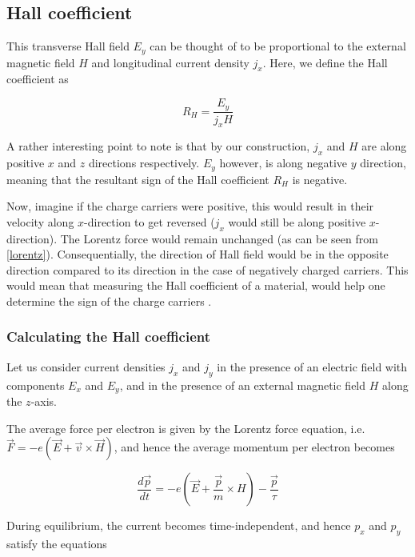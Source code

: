 \subsection{Hall coefficient}

This transverse Hall field $ E_y $ can be thought of to be proportional to the external magnetic field $ H $ and longitudinal current density $ j_x $.
Here, we define the Hall coefficient as

\begin{equation} \label{hall-coeff}
    R_H = \frac{E_y}{j_x H}
\end{equation}

A rather interesting point to note is that by our construction, $ j_x $ and $ H $ are along positive $ x $ and $ z $ directions respectively.
$ E_y $ however, is along negative $ y $ direction, meaning that the resultant sign of the Hall coefficient $ R_H $ is negative.

Now, imagine if the charge carriers were positive, this would result in their velocity along $ x $-direction to get reversed ($ j_x $ would still be along positive $ x $-direction).
The Lorentz force would remain unchanged (as can be seen from \cref{lorentz}).
Consequentially, the direction of Hall field would be in the opposite direction compared to its direction in the case of negatively charged carriers.
This would mean that measuring the Hall coefficient of a material, would help one determine the sign of the charge carriers \cite{ashcroft1976solid}.

\subsubsection{Calculating the Hall coefficient}

Let us consider current densities $ j_x $ and $ j_y $ in the presence of an electric field with components $ E_x $ and $ E_y $, and in the presence of an external magnetic field $ H $ along the $ z $-axis.

The average force per electron is given by the Lorentz force equation, i.e. $ \vec{F} = -e (\vec{E} + \vec{v} \times \vec{H}) $, and hence the average momentum per electron becomes

\begin{equation}
    \frac{d \vec{p}}{dt} = -e \left( \vec{E} + \frac{\vec{p}}{m} \times H \right) - \frac{\vec{p}}{\tau}
\end{equation}

During equilibrium, the current becomes time-independent, and hence $ p_x $ and $ p_y $ satisfy the equations

